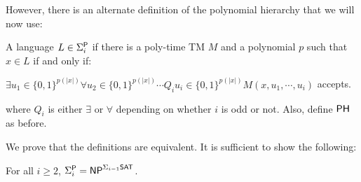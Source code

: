 However, there is an alternate definition of the polynomial hierarchy that we will now use:
\begin{definition}
A language $L \in \Sigma_i^\P$ if there is a poly-time TM $M$ and a polynomial $p$ such that $x \in L$ if and only if:
\begin{center}
$\exists u_1 \in \{0, 1\}^{p(|x|)} \forall u_2 \in \{0, 1\}^{p(|x|)} \cdots Q_iu_i \in \{0, 1\}^{p(|x|)} M(x, u_1, \cdots, u_i)$ accepts.
\end{center}
where $Q_i$ is either $\exists$ or $\forall$ depending on whether $i$ is odd or not. Also, define $\PH$ as before.
\end{definition}

We prove that the definitions are equivalent. It is sufficient to show the following:

\begin{theorem}
For all $i \ge 2$, $\Sigma_i^\P = \NP^{\Sigma_{i-1}\SAT}$.
\end{theorem}

